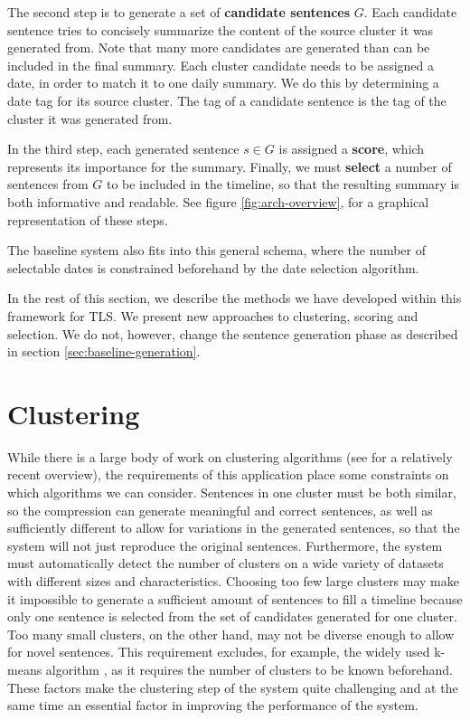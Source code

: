 \documentclass[a4paper,BCOR=10mm]{report}
\numberwithin{lemma}{chapter}
\numberwithin{definition}{chapter}
\begin{document}
The second step is to generate a set of \textbf{candidate sentences} $G$. Each candidate sentence tries to concisely summarize the content of the source cluster it was generated from. Note that many more candidates are generated than can be included in the final summary. Each cluster candidate needs to be assigned a date, in order to match it to one daily summary. We do this by determining a date tag for its source cluster. The tag of a candidate sentence is the tag of the cluster it was generated from.

In the third step, each generated sentence $s \in G$ is assigned a \textbf{score}, which represents its importance for the summary.
Finally, we must \textbf{select} a number of sentences from $G$ to be included in the timeline, so that the resulting summary is both informative and readable. See figure \ref{fig:arch-overview}, for a graphical representation of these steps.

The baseline system also fits into this general schema, where the number of selectable dates is constrained beforehand by the date selection algorithm.

In the rest of this section, we describe the methods we have developed within this framework for TLS. We present new approaches to clustering, scoring and selection. We do not, however, change the sentence generation phase as described in section \ref{sec:baseline-generation}.

\section{Clustering}

While there is a large body of work on clustering algorithms (see \citet{xu} for a relatively recent overview), the requirements of this application place some constraints on which algorithms we can consider. Sentences in one cluster must be both similar, so the compression can generate meaningful and correct sentences, as well as sufficiently different to allow for variations in the generated sentences, so that the system will not just reproduce the original sentences.
Furthermore, the system must automatically detect the number of clusters on a wide variety of datasets with different sizes and characteristics.
Choosing too few large clusters may make it impossible to generate a sufficient amount of sentences to fill a timeline because only one sentence is selected from the set of candidates generated for one cluster. Too many small clusters, on the other hand, may not be diverse enough to allow for novel sentences.
This requirement excludes, for example, the widely used k-means algorithm \citep{kmeans}, as it requires the number of clusters to be known beforehand.
These factors make the clustering step of the system quite challenging and at the same time an essential factor in improving the performance of the system.
\end{document}
